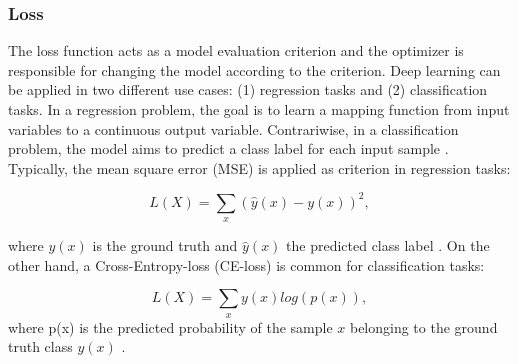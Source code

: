 \subsubsection{Loss}
The loss function acts as a model evaluation criterion and the optimizer is responsible for changing the model according to the criterion. Deep learning can be applied in two different use cases: (1) regression tasks and (2) classification tasks. In a regression problem, the goal is to learn a mapping function from input variables to a continuous output variable. Contrariwise, in a classification problem, the model aims to predict a class label for each input sample \cite{ShilohPerl2020}. Typically, the mean square error (MSE) is applied as criterion in regression tasks:

\begin{equation}
L(X) =  \sum_{x}(\hat{y}(x)-y(x))^2,
\end{equation}

where $y(x)$ is the ground truth and $\hat{y}(x)$ the predicted class label \cite{ShilohPerl2020}. On the other hand, a Cross-Entropy-loss (CE-loss) is common for classification tasks: 

\begin{equation}
L(X) = \sum_{x} y(x) log(p(x)),
\end{equation}
where p(x) is the predicted probability of the sample $x$ belonging to the ground truth class $y(x)$ \cite{ShilohPerl2020}.

